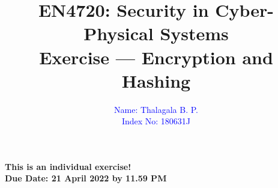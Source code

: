 \documentclass[11pt,letterpaper]{article}
\begin{document}
	
	\title{EN4720: Security in Cyber-Physical Systems \\ Exercise --- Encryption and Hashing}
	
	\author{ \textcolor{blue}{Name: Thalagala B. P.} \\ \textcolor{blue}{Index No: 180631J}}
	
	\maketitle
	
	\begin{center}
		\color{red}\bf This is an individual exercise! \\ Due Date: 21 April 2022 by 11.59 PM
	\end{center}
	
	
	
	
			
			
\end{document}
